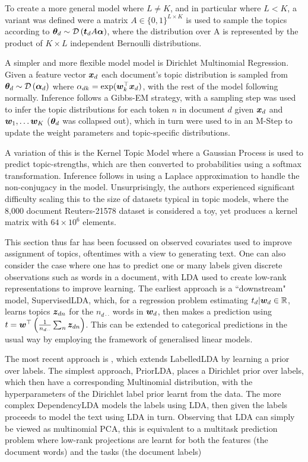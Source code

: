 To create a more general model where $L \neq K$, and in particular where $L < K$, a variant was defined were a matrix $A \in \{0,1\}^{L \times K}$ is used to sample the topics according to ${ \bm \theta_d } \sim \mathcal{D} \left( {\bm t_d A \bm \alpha} \right)$, where the distribution over A is represented by the product of $K \times L$ independent Bernoulli distributions.

A simpler and more flexible model model is Dirichlet Multinomial Regression\cite{Mimno2008}. Given a feature vector $\bm x_d$ each document's topic distribution is sampled from ${ \bm \theta_d } \sim \mathcal{D} \left( {\bm \alpha_{d}} \right)$ where $\alpha_{dk} = \exp(\bm w_k^\top\bm x_d)$, with the rest of the model following normally. Inference follows a Gibbs-EM strategy, with a sampling step was used to infer the topic distributions for each token $n$ in document $d$ given $\bm x_d$ and $\bm w_1, \ldots \bm w_K$ (${ \bm \theta_d }$ was collapsed out), which in turn were used to in an M-Step to update the weight parameters and topic-specific distributions.

A variation of this is the Kernel Topic Model\cite{Hennig2012} where a Gaussian Process is used to predict topic-strengths, which are then converted to probabilities using a softmax transformation. Inference follows \cite{WilliamsBarber1998} in using a Laplace approximation to handle the non-conjugacy in the model. Unsurprisingly, the authors experienced significant difficulty scaling this to the size of datasets typical in topic models, where the 8,000 document Reuters-21578 dataset is considered a toy, yet produces a kernel matrix with $64 \times 10^6$ elements.

This section thus far has been focussed on observed covariates used to improve assignment of topics, oftentimes with a view to generating text. One can also consider the case where one has to predict one or many labels given discrete observations such as words in a document, with LDA used to create low-rank representations to improve learning. The earliest approach is a ``downstream" model, SupervisedLDA\cite{Blei2008}, which, for a regression problem estimating $t_d|\bm w_d \in { \mathbb{R} }$, learns topics $\bm z_{dn}$ for the $n_{d\cdot\cdot}$ words in $\bm w_d$, then makes a prediction using $t = \bm w^\top\left(\frac{1}{ {n_{d\cdot\cdot}} }\sum_n \bm z_{dn}\right)$. This can be extended to categorical predictions in the usual way by employing the framework of generalised linear models.

The most recent approach is \cite{Rubin2011}, which extends LabelledLDA\cite{Ramage2009} by learning a prior over labels. The simplest approach, PriorLDA, places a Dirichlet prior over labels, which then have a corresponding Multinomial distribution, with the hyperparameters of the Dirichlet label prior learnt from the data. The more complex DependencyLDA models the labels using LDA, then given the labels proceeds to model the text using LDA in turn. Observing that LDA can simply be viewed as multinomial PCA, this is equivalent to a multitask prediction problem where low-rank projections are learnt for both the features (the document words) and the tasks (the document labels)



